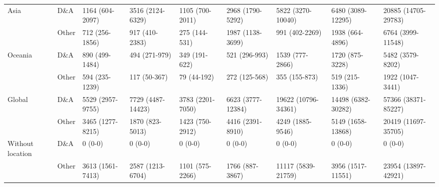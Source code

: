 \begin{tabular}{ll |p{1.5cm} p{1.5cm} p{1.5cm} p{1.5cm} p{1.5cm} p{1.5cm} p{1.5cm}}
Asia & D\&A &               1164 \mbox{(604-2097)} &          3516 \mbox{(2124-6329)} &         1105 \mbox{(700-2011)} &                 2968 \mbox{(1790-5292)} &      5822 \mbox{(3270-10040)} &   6480 \mbox{(3089-12295)} &  20885 \mbox{(14705-29783)} \\
                 & Other &                712 \mbox{(256-1856)} &            917 \mbox{(410-2383)} &           275 \mbox{(144-531)} &                 1987 \mbox{(1138-3699)} &         991 \mbox{(402-2269)} &     1938 \mbox{(664-4896)} &    6764 \mbox{(3999-11548)} \\
Oceania & D\&A &                890 \mbox{(499-1484)} &             494 \mbox{(271-979)} &           349 \mbox{(191-622)} &                    521 \mbox{(296-993)} &        1539 \mbox{(777-2866)} &     1720 \mbox{(875-3228)} &     5482 \mbox{(3579-8202)} \\
                 & Other &                594 \mbox{(235-1239)} &              117 \mbox{(50-367)} &             79 \mbox{(44-192)} &                    272 \mbox{(125-568)} &          355 \mbox{(155-873)} &      519 \mbox{(215-1336)} &     1922 \mbox{(1047-3441)} \\
Global & D\&A &              5529 \mbox{(2957-9755)} &         7729 \mbox{(4487-14423)} &        3783 \mbox{(2201-7050)} &                6623 \mbox{(3777-12384)} &    19622 \mbox{(10796-34361)} &  14498 \mbox{(6382-30282)} &  57366 \mbox{(38371-85227)} \\
                 & Other &              3465 \mbox{(1277-8215)} &           1870 \mbox{(823-5013)} &         1423 \mbox{(750-2912)} &                 4416 \mbox{(2391-8910)} &       4249 \mbox{(1885-9546)} &   5149 \mbox{(1658-13868)} &  20419 \mbox{(11697-35705)} \\
Without location & D\&A &                       0 \mbox{(0-0)} &                   0 \mbox{(0-0)} &                 0 \mbox{(0-0)} &                          0 \mbox{(0-0)} &                0 \mbox{(0-0)} &             0 \mbox{(0-0)} &              0 \mbox{(0-0)} \\
                 & Other &              3613 \mbox{(1561-7413)} &          2587 \mbox{(1213-6704)} &         1101 \mbox{(575-2266)} &                  1766 \mbox{(887-3867)} &     11117 \mbox{(5839-21759)} &   3956 \mbox{(1517-11551)} &  23954 \mbox{(13897-42921)} \\
\bottomrule
\end{tabular}
